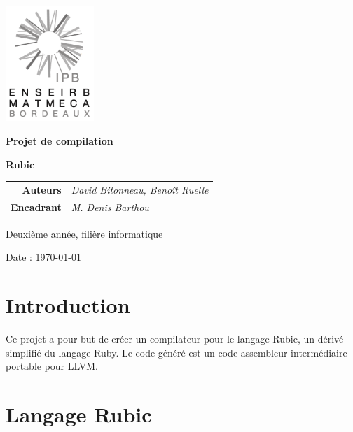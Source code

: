 \documentclass[12pt]{article}
\begin{document}
\thispagestyle{empty}
\noindent\includegraphics[width=0.25\textwidth]{enseirb-matmeca}


\begin{center}
    {\Huge\textbf{Projet de compilation}


    \textbf{Rubic}}
\end{center}


\begin{tabular}{r@{:~}l}
	\textbf{Auteurs} & \textit{David Bitonneau, Benoît Ruelle}\\
	\textbf{Encadrant} & \textit{M. Denis Barthou}\\
\end{tabular}


\begin{center}Deuxième année, filière informatique

    Date : \today
\end{center}

\newpage

\section{Introduction}

Ce projet a pour but de créer un compilateur pour le langage Rubic, un dérivé
simplifié du langage Ruby. Le code généré est un code assembleur intermédiaire
portable pour LLVM.

\section{Langage Rubic}
\end{document}
